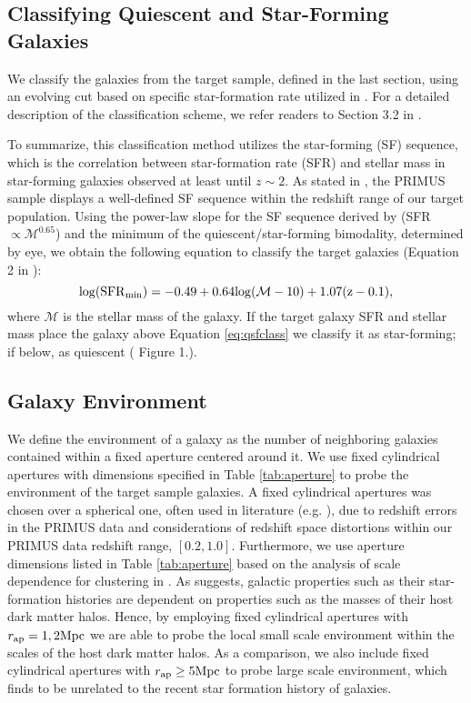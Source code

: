 \documentclass{emulateapj}
\begin{document}
\subsection{Classifying Quiescent and Star-Forming Galaxies} \label{sec:sfq}
We classify the galaxies from the target sample, defined in the last section, using an evolving cut based on specific star-formation rate utilized in \cite{Moustakas:2013aa}.
For a detailed description of the classification scheme, we refer readers to Section 3.2 in \cite{Moustakas:2013aa}.

To summarize, this classification method utilizes the star-forming (SF) sequence, which is the correlation between star-formation rate (SFR) and stellar mass in star-forming 
galaxies observed at least until $z \sim 2$.
As stated in \cite{Moustakas:2013aa}, the PRIMUS sample displays a well-defined SF sequence within the redshift range of our target population.
Using the power-law slope for the SF sequence derived by \cite{Salim:2007aa} (SFR $\propto \mathcal{M}^{0.65}$) and the minimum of the quiescent/star-forming bimodality, 
determined by eye, we obtain the following equation to classify the target galaxies (Equation 2 in \cite{Moustakas:2013aa}):
\begin{equation}
\label{eq:qsfclass} 
\rm{log}(\rm{SFR}_{\rm{min}}) = -0.49 + 0.64 \rm{log}(\mathcal{M} - 10) +1.07(z-0.1), 
\end{equation}
where $\mathcal{M}$ is the stellar mass of the galaxy.
If the target galaxy SFR and stellar mass place the galaxy above Equation \ref{eq:qsfclass} we classify it as star-forming; if below, as quiescent (\cite{Moustakas:2013aa} Figure 1.).

\subsection{Galaxy Environment} \label{sec:environment}
We define the environment of a galaxy as the number of neighboring galaxies contained within a fixed aperture centered around it.
We use fixed cylindrical apertures with dimensions specified in Table \ref{tab:aperture} to probe the environment of the target sample galaxies. 
A fixed cylindrical apertures was chosen over a spherical one, often used in literature (e.g. \cite{Croton:2005aa}), due to redshift errors in the PRIMUS data 
and considerations of redshift space distortions within our PRIMUS data redshift range, $[0.2,1.0]$.
Furthermore, we use aperture dimensions listed in Table \ref{tab:aperture} based on the analysis of scale dependence for clustering in \cite{Blanton:2006aa}.
As \cite{Blanton:2006aa} suggests, galactic properties such as their star-formation histories are dependent on properties such as the masses of their host dark matter halos.
Hence, by employing fixed cylindrical apertures with $r_{\rm{ap}} = 1, 2 \rm{Mpc}$ we are able to probe the local small scale environment within the scales of the host dark matter halos.
As a comparison, we also include fixed cylindrical apertures with $r_{\rm{ap}} \ge 5 \rm{Mpc}$ to probe large scale environment, which \cite{Blanton:2006aa} finds to be unrelated to the 
recent star formation history of galaxies.
\end{document}
